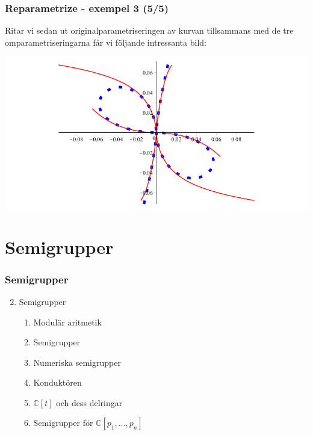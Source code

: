 \documentclass{beamer}
\begin{document}
\begin{frame}
	\frametitle{Reparametrize - exempel 3 (5/5)}
	
	\begin{example}
		Ritar vi sedan ut originalparametriseringen av kurvan tillsammans med de tre omparametriseringarna får vi följande intressanta bild:

		\begin{center}
			\includegraphics[scale=0.35]{Export/kurvorplot2d3.png}
		\end{center}
	\end{example}
\end{frame}








\section{Semigrupper}

\begin{frame}
	\frametitle{Semigrupper}
	\begin{enumerate}
		\setcounter{enumi}{1}
		\item<1-> Semigrupper
		\begin{enumerate}
			\item<2-> Modulär aritmetik
			\item<3-> Semigrupper
			\item<4-> Numeriska semigrupper
			\item<5-> Konduktören
			\item<6-> $\mathbb{C}[t]$ och dess delringar
			\item<7-> Semigrupper för $\mathbb{C}[p_1,\ldots,p_n]$
		\end{enumerate}
	\end{enumerate}
\end{frame}
\end{document}

